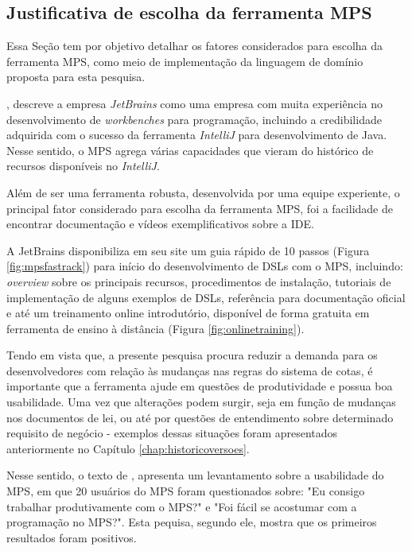 \subsection{Justificativa de escolha da ferramenta MPS}
\label{justificativamps}

Essa Seção tem por objetivo detalhar os fatores considerados para escolha da ferramenta \gls{MPS}, como meio de implementação da linguagem de domínio proposta para esta pesquisa.

, descreve a empresa \textit{JetBrains} como uma empresa com muita experiência no desenvolvimento de \textit{workbenches} para programação, incluindo a credibilidade adquirida com o sucesso da ferramenta \textit{IntelliJ} para desenvolvimento de Java.  Nesse sentido, o \gls{MPS} agrega várias capacidades que vieram do histórico de recursos disponíveis no \textit{IntelliJ}. 

Além de ser uma ferramenta robusta, desenvolvida por uma equipe experiente, o principal fator considerado para escolha da ferramenta \gls{MPS}, foi a facilidade de encontrar documentação e vídeos exemplificativos sobre a \gls{IDE}. 

A JetBrains disponibiliza em seu site um guia rápido de 10 passos (Figura \ref{fig:mpsfastrack}) para início do desenvolvimento de \gls{DSL}s com o \gls{MPS}, incluindo: \textit{overview} sobre os principais recursos, procedimentos de instalação, tutoriais de implementação de alguns exemplos de \gls{DSL}s, referência para documentação oficial e até um treinamento online introdutório, disponível de forma gratuita em ferramenta de ensino à distância (Figura \ref{fig:onlinetraining}).  





\newpage
Tendo em vista que, a presente pesquisa procura reduzir a demanda para os desenvolvedores com relação às mudanças nas regras do sistema de cotas, é importante que a ferramenta ajude em questões de produtividade e possua boa usabilidade. Uma vez que alterações podem surgir, seja em função de mudanças nos documentos de lei, ou até por questões de entendimento sobre determinado requisito de negócio - exemplos dessas situações foram apresentados anteriormente no Capítulo \ref{chap:historicoversoes}.

Nesse sentido, o texto de  , apresenta um levantamento sobre a usabilidade do \gls{MPS}, em que 20 usuários do \gls{MPS} foram questionados sobre: "Eu consigo trabalhar produtivamente com o MPS?" e "Foi fácil se acostumar com a programação no MPS?". Esta pequisa, segundo ele, mostra que os primeiros resultados foram positivos. 

